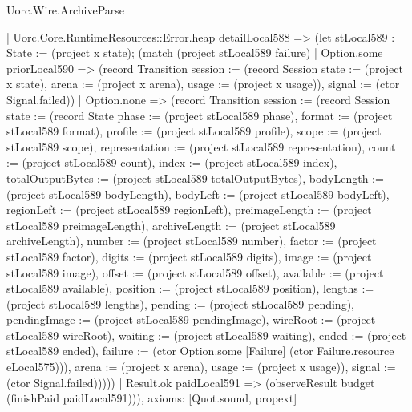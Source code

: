 \begin{lexlean}{Uorc.Wire.ArchiveParse}
\begin{semanticmodule}
{      | Uorc.Core.RuntimeResources::Error.heap detailLocal588 => (let stLocal589 : State := (project x state); (match (project stLocal589 failure)
        | Option.some priorLocal590 => (record Transition {session := (record Session {state := (project x state), arena := (project x arena), usage := (project x usage)}), signal := (ctor Signal.failed)})
        | Option.none => (record Transition {session := (record Session {state := (record State {phase := (project stLocal589 phase), format := (project stLocal589 format), profile := (project stLocal589 profile), scope := (project stLocal589 scope), representation := (project stLocal589 representation), count := (project stLocal589 count), index := (project stLocal589 index), totalOutputBytes := (project stLocal589 totalOutputBytes), bodyLength := (project stLocal589 bodyLength), bodyLeft := (project stLocal589 bodyLeft), regionLeft := (project stLocal589 regionLeft), preimageLength := (project stLocal589 preimageLength), archiveLength := (project stLocal589 archiveLength), number := (project stLocal589 number), factor := (project stLocal589 factor), digits := (project stLocal589 digits), image := (project stLocal589 image), offset := (project stLocal589 offset), available := (project stLocal589 available), position := (project stLocal589 position), lengths := (project stLocal589 lengths), pending := (project stLocal589 pending), pendingImage := (project stLocal589 pendingImage), wireRoot := (project stLocal589 wireRoot), waiting := (project stLocal589 waiting), ended := (project stLocal589 ended), failure := (ctor Option.some [Failure] (ctor Failure.resource eLocal575))}), arena := (project x arena), usage := (project x usage)}), signal := (ctor Signal.failed)}))))
    | Result.ok paidLocal591 => (observeResult budget (finishPaid paidLocal591))),
  axioms: [Quot.sound, propext]
}


\end{semanticmodule}
\end{lexlean}
